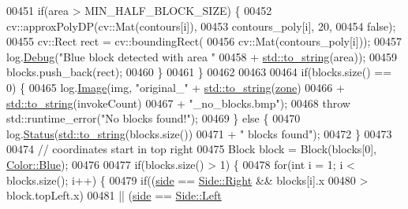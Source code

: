 \begin{DoxyCode}
00451             \textcolor{keywordflow}{if}(area > MIN\_HALF\_BLOCK\_SIZE) \{
00452                 cv::approxPolyDP(cv::Mat(contours[i]),
00453                         contours\_poly[i], 20,
00454                         \textcolor{keyword}{false});
00455                 cv::Rect rect = cv::boundingRect(
00456                         cv::Mat(contours\_poly[i]));
00457                 log.\hyperlink{classChipChipArray_1_1Log_ac32b435af1577e4ebc67af2bdfea8eff}{Debug}(\textcolor{stringliteral}{"Blue block detected with area "}
00458                         + \hyperlink{namespacestd_aa5ddf582a1c96ffe258c997be9a294a3}{std::to\_string}(area));
00459                 blocks.push\_back(rect);
00460             \}
00461         \}
00462 
00463 
00464         \textcolor{keywordflow}{if}(blocks.size() == 0) \{
00465             log.\hyperlink{classChipChipArray_1_1Log_a65bbab057c8b1453f9e4efcfee7522c4}{Image}(img, \textcolor{stringliteral}{"original\_"} + \hyperlink{namespacestd_aa5ddf582a1c96ffe258c997be9a294a3}{std::to\_string}(\hyperlink{classChipChipArray_1_1Grabber_ab57efe6e0b6f369b19528285a278d967}{zone})
00466                     + \hyperlink{namespacestd_aa5ddf582a1c96ffe258c997be9a294a3}{std::to\_string}(invokeCount)
00467                     + \textcolor{stringliteral}{"\_no\_blocks.bmp"});
00468             \textcolor{keywordflow}{throw} std::runtime\_error(\textcolor{stringliteral}{"No blocks found!"});
00469         \} \textcolor{keywordflow}{else} \{
00470             log.\hyperlink{classChipChipArray_1_1Log_a66575b6e94c6112e4cefa5736cb996e0}{Status}(\hyperlink{namespacestd_aa5ddf582a1c96ffe258c997be9a294a3}{std::to\_string}(blocks.size())
00471                     + \textcolor{stringliteral}{" blocks found"});
00472         \}
00473 
00474         \textcolor{comment}{// coordinates start in top right}
00475         Block block = Block(blocks[0], \hyperlink{definitions_8hpp_abc05a0f46084a3477cf5d5c939ff1436a9594eec95be70e7b1710f730fdda33d9}{Color::Blue});
00476 
00477         \textcolor{keywordflow}{if}(blocks.size() > 1) \{
00478             \textcolor{keywordflow}{for}(\textcolor{keywordtype}{int} i = 1; i < blocks.size(); i++) \{ 
00479                 \textcolor{keywordflow}{if}((\hyperlink{classChipChipArray_1_1Grabber_a8afbaefae7c767c862fd1bf13968539b}{side} == \hyperlink{definitions_8hpp_a03325a8a9d4f105db5e37dd587128142a92b09c7c48c520c3c55e497875da437c}{Side::Right} && blocks[i].x 
00480                             > block.topLeft.x)
00481                         || (\hyperlink{classChipChipArray_1_1Grabber_a8afbaefae7c767c862fd1bf13968539b}{side} == \hyperlink{definitions_8hpp_a03325a8a9d4f105db5e37dd587128142a945d5e233cf7d6240f6b783b36a374ff}{Side::Left}

\end{DoxyCode}
